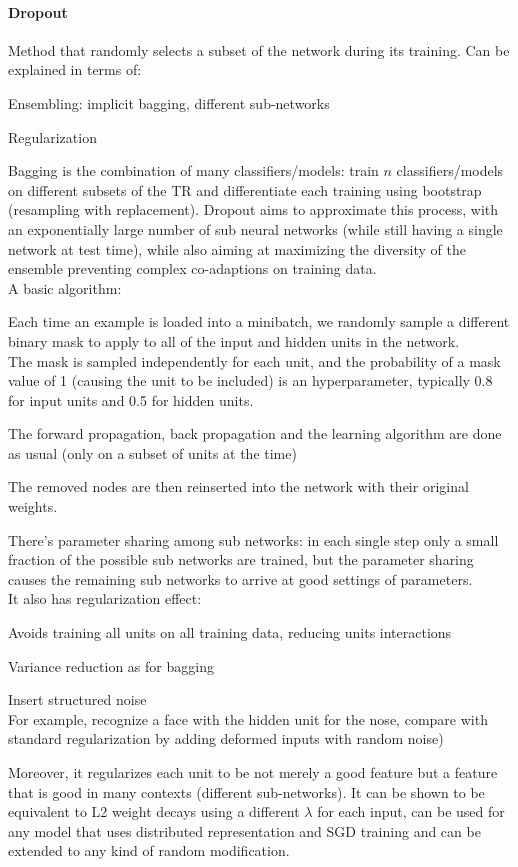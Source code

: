 \documentclass[10pt]{report}
\begin{document}
\paragraph{Dropout} Method that randomly selects a subset of the network during its training. Can be explained in terms of:
\begin{list}{}{}
	\item Ensembling: implicit bagging, different sub-networks
	\item Regularization
\end{list}
Bagging is the combination of many classifiers/models: train $n$ classifiers/models on different subsets of the TR and differentiate each training using bootstrap (resampling with replacement). Dropout aims to approximate this process, with an exponentially large number of sub neural networks (while still having a single network at test time), while also aiming at maximizing the diversity of the ensemble preventing complex co-adaptions on training data.\\
A basic algorithm:
\begin{list}{}{}
	\item Each time an example is loaded into a minibatch, we randomly sample a different binary mask to apply to all of the input and hidden units in the network.\\
	The mask is sampled independently for each unit, and the probability of a mask value of 1 (causing the unit to be included) is an hyperparameter, typically 0.8 for input units and 0.5 for hidden units.
	\item The forward propagation, back propagation and the learning algorithm are done as usual (only on a subset of units at the time)
	\item The removed nodes are then reinserted into the network with their original weights.
\end{list}
There's parameter sharing among sub networks: in each single step only a small fraction of the possible sub networks are trained, but the parameter sharing causes the remaining sub networks to arrive at good settings of parameters.\\
It also has regularization effect:\begin{list}{}{}
	\item Avoids training all units on all training data, reducing units interactions
	\item Variance reduction as for bagging
	\item Insert structured noise\\
	For example, recognize a face with the hidden unit for the nose, compare with standard regularization by adding deformed inputs with random noise)
\end{list}
Moreover, it regularizes each unit to be not merely a good feature but a feature that is good in many contexts (different sub-networks). It can be shown to be equivalent to L2 weight decays using a different $\lambda$ for each input, can be used for any model that uses distributed representation and SGD training and can be extended to any kind of random modification.
\end{document}
